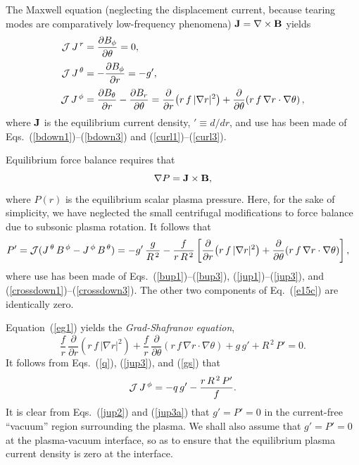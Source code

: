 \documentclass[12pt,prb,aps]{revtex4-1}
\begin{document}
The Maxwell equation (neglecting the displacement current, because tearing modes are comparatively low-frequency phenomena)
${\bf J}= \nabla\times{\bf B}$
yields
\begin{align}
{\cal J}\,J^{\,r} &= \frac{\partial B_\phi}{\partial \theta} =0,\label{jup1}\\[0.5ex]
{\cal J}\,J^{\,\theta} &= -\frac{\partial B_\phi}{\partial r} = - g',\label{jup2}\\[0.5ex]
{\cal J}\,J^{\,\phi}&= \frac{\partial B_\theta}{\partial r} -\frac{\partial B_r}{\partial\theta}=\frac{\partial}{\partial r}\!\left(r\,f\,|\nabla r|^2\right)+ \frac{\partial}{\partial\theta}\!\left(r\,f\,\nabla r\cdot\nabla\theta\right),\label{jup3}
\end{align}
where ${\bf J}$ is the equilibrium current density, $'\equiv d/dr$, and use has been made of  Eqs.~(\ref{bdown1})--(\ref{bdown3}) and (\ref{curl1})--(\ref{curl3}).

Equilibrium force balance requires that
\begin{equation}\label{e15c}
 \nabla P={\bf J}\times {\bf B},
\end{equation}
where $P(r)$ is the equilibrium scalar plasma pressure. Here, for the sake of simplicity, we have neglected the small centrifugal modifications to force balance due to subsonic plasma
rotation.\cite{flow,flow1}
It follows that 
\begin{align}\label{eg1}
P'&= {\cal J}(J^{\,\theta}\,B^{\,\phi}-J^{\,\phi}\,B^{\,\theta})= -g'\,\frac{g}{R^{\,2}} - \frac{f}{r\,R^{\,2}}\left[\frac{\partial}{\partial r}\!\left(r\,f\,|\nabla r|^2\right)+ \frac{\partial}{\partial\theta}\!\left(r\,f\,\nabla r\cdot\nabla\theta\right)\right],
\end{align}
where use has been made of Eqs.~(\ref{bup1})--(\ref{bup3}),  (\ref{jup1})--(\ref{jup3}), and (\ref{crossdown1})--(\ref{crossdown3}). The
other two components of Eq.~(\ref{e15c}) are identically zero. 

Equation~(\ref{eg1}) yields the {\em Grad-Shafranov equation},\cite{gs1}
\begin{equation}\label{gs}
\frac{f}{r}\,\frac{\partial}{\partial r}\!\left(r\,f\,|\nabla r|^2\right) +\frac{f}{r}\,\frac{\partial}{\partial\theta}\!\left(r\,f\,\nabla r\cdot\nabla\theta\right)+g\,g' + R^{\,2}\,P'=0.
\end{equation}
It follows from Eqs.~(\ref{q}), (\ref{jup3}), and (\ref{gs}) that
\begin{equation}\label{jup3a}
{\cal J}\,J^{\,\phi} = -q\,g' - \frac{r\,R^{\,2}\,P'}{f}.
\end{equation}
It is clear from Eqs.~(\ref{jup2}) and (\ref{jup3a}) that $g'=P'=0$ in the  current-free ``vacuum'' region surrounding the plasma.
We shall also assume that $g'=P'=0$ at the plasma-vacuum interface, so as to ensure that the equilibrium plasma
current density is zero at the interface. 
\end{document}
